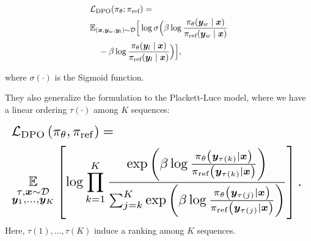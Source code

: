 \begin{align}
\begin{split}
	&\mathcal{L}_{\mathrm{DPO}}(\pi_\theta ; \pi_{\text{ref}})=\\
	&\mathbb{E}_{({\bm{x}}, {\bm{y}}_w, {\bm{y}}_l) \sim \mathcal{D}}\Big[ \log \sigma\Big(\beta \log \frac{\pi_\theta({\bm{y}}_w \mid {\bm{x}})}{\pi_{\text{ref}}({\bm{y}}_w \mid {\bm{x}})} \\
	&\quad -\beta \log \frac{\pi_\theta({\bm{y}}_l \mid {\bm{x}})}{\pi_{\text{ref}}({\bm{y}}_l \mid {\bm{x}})}\Big)\Big],
\end{split}
\end{align}

where $\sigma(\cdot)$ is the Sigmoid function.

They also generalize the formulation to the Plackett-Luce model, where we have a linear ordering $\tau(\cdot)$ among $K$ sequences:


\begin{equation}\label{eq:rankdpo}
\resizebox{\columnwidth}{!}{%
$
\begin{split}
		&\mathcal{L}_{\mathrm{DPO}}\left(\pi_\theta, \pi_{\mathrm{ref}}\right)=\\
		&\underset{\substack{\tau, \vx \sim \mathcal{D} \\  \vy_1, \ldots, \vy_K} }{\mathbb{E}}\left[\log \prod_{k=1}^K \frac{\exp \left(\beta \log \frac{\pi_\theta\left(\vy_{\tau(k)} \mid \vx\right)}{\pi_{\mathrm{ref}}\left(\vy_{\tau(k)} \mid \vx\right)}\right)}{\sum_{j=k}^K \exp \left(\beta \log \frac{\pi_\theta\left(\vy_{\tau(j)} \mid \vx\right)}{\pi_{\mathrm{ref}}\left(\vy_{\tau(j)} \mid \vx\right)}\right)}\right].
\end{split}
$
}
\end{equation}
Here, $\tau(1),\ldots, \tau(K)$ induce a ranking among $K$ sequences.


